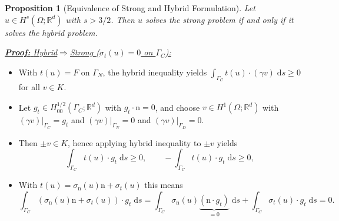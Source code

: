 \documentclass[10pt,aspectratio=169]{beamer}
\newtheorem{proposition}{Proposition}[section]
\def\R{{\mathbb R}}
\def\d{{\mathrm{d}}}
\def\ds{{\d s}}
\begin{document}
\begin{frame}
	\begin{proposition}[Equivalence of Strong and Hybrid Formulation]
		Let $u\in H^s(\Omega;\R^d)$ with $s>3/2$. Then $u$ solves the strong problem if and only if it solves the hybrid problem.
	\end{proposition}
	\underline{\textbf{\em Proof:} {\em Hybrid\enspace}$\Longrightarrow${\em\enspace Strong ($\sigma_t(u) = 0$ on $\Gamma_C$):}}
	\begin{itemize}
		\item With $t(u)=F$ on $\Gamma_N$, the hybrid inequality yields $\displaystyle \int_{\Gamma_C} t(u)\cdot (\gamma v)\;\ds \ge 0$ for all $v\in K$.
		\item Let $g_t\in H^{1/2}_{00}(\Gamma_C;\R^d)$ with $g_t\cdot \mathrm{n} = 0$, and choose $v\in H^1(\Omega;\R^d)$ with $(\gamma v)|_{\Gamma_C} = g_t$ and $(\gamma v)|_{\Gamma_N}=0$ and $(\gamma v)|_{\Gamma_D} = 0$.
		\item Then $\pm v\in K$, hence applying hybrid inequality to $\pm v$ yields
		      \begin{equation*}
			      \int_{\Gamma_C} t(u)\cdot g_t\;\ds \ge 0,\qquad -\int_{\Gamma_C} t(u)\cdot g_t\;\ds \ge 0,
		      \end{equation*}
		\item With $t(u)=\sigma_\mathrm{n}(u)\mathrm{n}+\sigma_t(u)$ this means
		      \begin{equation*}
			      \int_{\Gamma_C} (\sigma_\mathrm{n}(u)\mathrm{n}+\sigma_t(u))\cdot g_t\;\ds = \int_{\Gamma_C} \sigma_\mathrm{n}(u)\underbrace{(\mathrm{n}\cdot g_t)}_{ = 0}\;\ds + \int_{\Gamma_C}\sigma_t(u)\cdot g_t\;\ds = 0.
		      \end{equation*}
	\end{itemize}
\end{frame}
\end{document}
